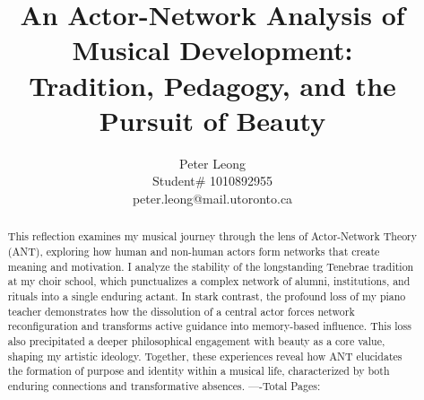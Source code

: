 \documentclass{article} %
\title{An Actor-Network Analysis of Musical Development:\\
Tradition, Pedagogy, and the Pursuit of Beauty}
\author{Peter Leong \\
Student\# 1010892955 \\
peter.leong@mail.utoronto.ca \\
\AND
}
\begin{document}
\maketitle

\vspace{-6ex}

\begin{abstract}
This reflection examines my musical journey through the lens of Actor-Network Theory (ANT), exploring how human and non-human actors form networks that create meaning and motivation. 
I analyze the stability of the longstanding Tenebrae tradition at my choir school, which punctualizes a complex network of alumni, institutions, and rituals into a single enduring actant. 
In stark contrast, the profound loss of my piano teacher demonstrates how the dissolution of a central actor forces network reconfiguration and transforms active guidance into memory-based influence. 
This loss also precipitated a deeper philosophical engagement with beauty as a core value, shaping my artistic ideology. Together, these experiences reveal how ANT elucidates the formation of purpose and identity within a musical life, characterized by both enduring connections and transformative absences.
----Total Pages: \pageref{last_page}
\end{abstract}

\vspace{2ex}
\end{document}
